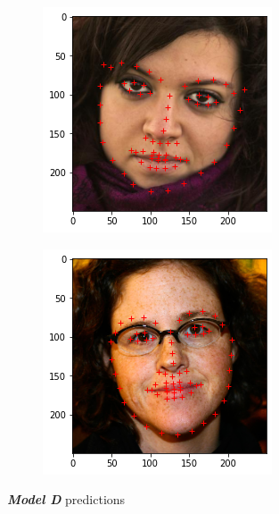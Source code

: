 \documentclass{article}
\begin{document}
\begin{figure}[h]
  \centering
  \begin{subfigure}[b]{0.35\textwidth}
    \includegraphics[width=\textwidth]{D1}
  \end{subfigure}
  \begin{subfigure}[b]{.35\textwidth}
    \includegraphics[width=\textwidth]{D5}
  \end{subfigure}
  \caption{\textbf{\textit{Model D}} predictions}
  \label{fig:model-D}
\end{figure}
\end{document}
